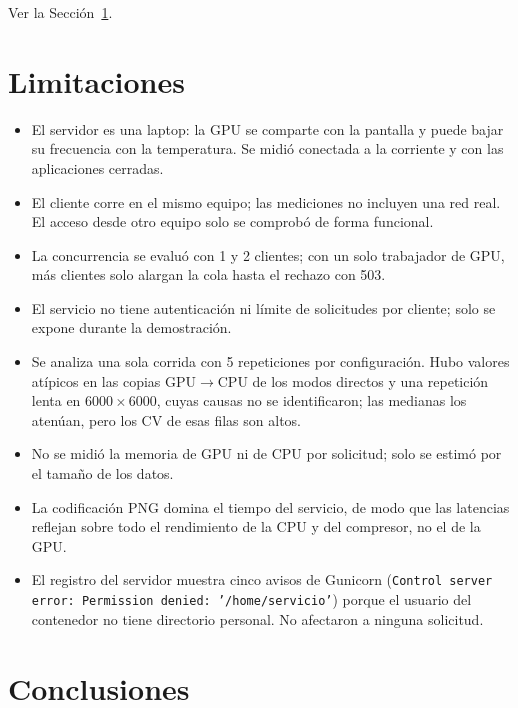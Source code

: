 \documentclass[12pt]{article}
\begin{document}
Ver la Sección~\ref{sec:limitaciones}.

\section{Limitaciones}\label{sec:limitaciones}

\begin{itemize}
\item El servidor es una laptop: la GPU se comparte con la pantalla y puede bajar su frecuencia con
      la temperatura. Se midió conectada a la corriente y con las aplicaciones cerradas.
\item El cliente corre en el mismo equipo; las mediciones no incluyen una red real. El acceso desde
      otro equipo solo se comprobó de forma funcional.
\item La concurrencia se evaluó con 1 y 2 clientes; con un solo trabajador de GPU, más clientes solo
      alargan la cola hasta el rechazo con 503.
\item El servicio no tiene autenticación ni límite de solicitudes por cliente; solo se expone durante
      la demostración.
\item Se analiza una sola corrida con 5 repeticiones por configuración. Hubo valores atípicos en
      las copias GPU$\to$CPU de los modos directos y una repetición lenta en $6000\times6000$, cuyas
      causas no se identificaron; las medianas los atenúan, pero los CV de esas filas son altos.
\item No se midió la memoria de GPU ni de CPU por solicitud; solo se estimó por el tamaño de los datos.
\item La codificación PNG domina el tiempo del servicio, de modo que las latencias reflejan sobre todo
      el rendimiento de la CPU y del compresor, no el de la GPU.
\item El registro del servidor muestra cinco avisos de Gunicorn
      (\texttt{Control server error: Permission denied: '/home/servicio'}) porque el usuario del
      contenedor no tiene directorio personal. No afectaron a ninguna solicitud.
\end{itemize}

\section{Conclusiones}
\end{document}
